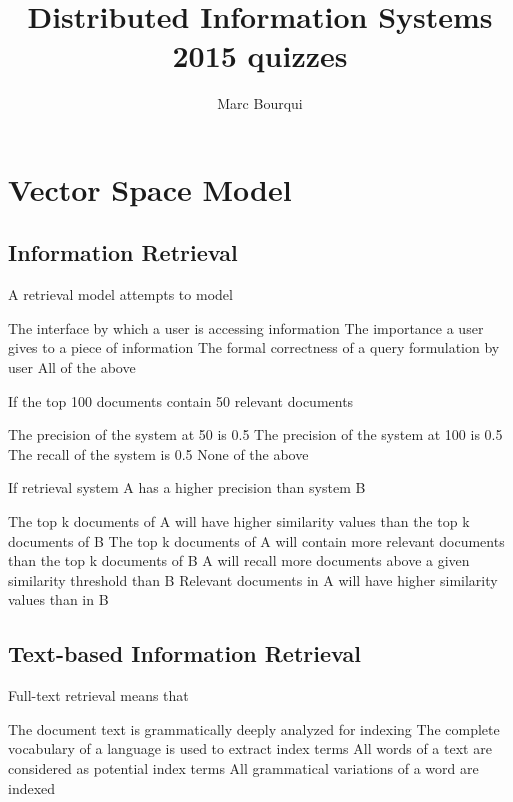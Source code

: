 \documentclass[12pt,a4paper]{exam}
\author{Marc Bourqui}
\title{Distributed Information Systems 2015 quizzes}
\begin{document}



\section{Vector Space Model} %
\subsection{Information Retrieval}
\begin{questions}
\question A retrieval model attempts to model
\begin{checkboxes}
\choice The interface by which a user is accessing information
\CorrectChoice The importance a user gives to a piece of information
\choice The formal correctness of a query formulation by user
\choice All of the above
\end{checkboxes}

\question If the top 100 documents contain 50 relevant documents
\begin{checkboxes}
\choice The precision of the system at 50 is 0.5
\choice The precision of the system at 100 is 0.5
\choice The recall of the system is 0.5
\choice None of the above
\end{checkboxes}

\question If retrieval system A has a higher precision than
system B
\begin{checkboxes}
\choice The top k documents of A will have higher similarity
values than the top k documents of B
\choice The top k documents of A will contain more relevant
documents than the top k documents of B
\choice A will recall more documents above a given similarity
threshold than B
\choice Relevant documents in A will have higher similarity
values than in B
\end{checkboxes}
\end{questions}

\subsection{Text-based Information Retrieval}
\begin{questions}
\question Full-text retrieval means that
\begin{checkboxes}
\choice The document text is grammatically deeply analyzed
for indexing
\choice The complete vocabulary of a language is used to
extract index terms
\choice All words of a text are considered as potential index
terms
\choice All grammatical variations of a word are indexed
\end{checkboxes}
\end{questions}
\end{document}
